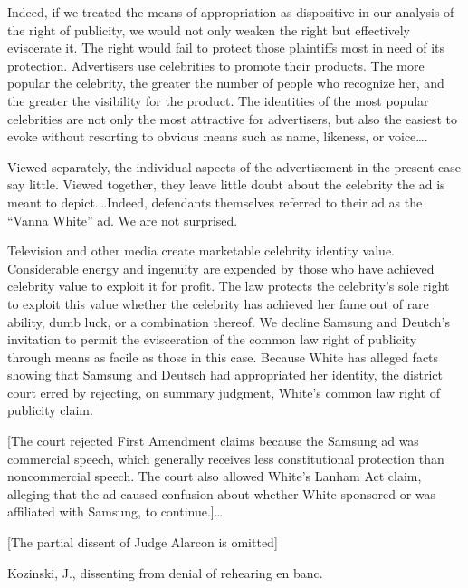 Indeed, if we treated the means of appropriation as dispositive in our analysis
of the right of publicity, we would not only weaken the right but effectively
eviscerate it. The right would fail to protect those plaintiffs most in need of
its protection. Advertisers use celebrities to promote their products. The more
popular the celebrity, the greater the number of people who recognize her, and
the greater the visibility for the product. The identities of the most popular
celebrities are not only the most attractive for advertisers, but also the
easiest to evoke without resorting to obvious means such as name, likeness, or
voice\dots.

Viewed separately, the individual aspects of the advertisement in the present
case say little. Viewed together, they leave little doubt about the celebrity
the ad is meant to depict.\dots Indeed, defendants themselves referred to
their ad as the ``Vanna White'' ad. We are not surprised.

Television and other media create marketable celebrity identity value.
Considerable energy and ingenuity are expended by those who have achieved
celebrity value to exploit it for profit. The law protects the celebrity's sole
right to exploit this value whether the celebrity has achieved her fame out of
rare ability, dumb luck, or a combination thereof. We decline Samsung and
Deutch's invitation to permit the evisceration of the common law right of
publicity through means as facile as those in this case. Because White has
alleged facts showing that Samsung and Deutsch had appropriated her identity,
the district court erred by rejecting, on summary judgment, White's common law
right of publicity claim.

[The court rejected First Amendment claims because the Samsung ad was commercial
speech, which generally receives less constitutional protection than
noncommercial speech.  The court also allowed White's Lanham Act claim,
alleging that the ad caused confusion about whether White sponsored or was
affiliated with Samsung, to continue.]\dots

[The partial dissent of Judge Alarcon is omitted]


Kozinski, J., dissenting from denial of rehearing en banc.

